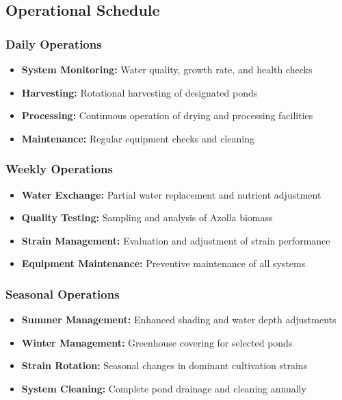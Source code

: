 \subsection{Operational Schedule}

\subsubsection{Daily Operations}
\begin{itemize}
    \item \textbf{System Monitoring:} Water quality, growth rate, and health checks
    \item \textbf{Harvesting:} Rotational harvesting of designated ponds
    \item \textbf{Processing:} Continuous operation of drying and processing facilities
    \item \textbf{Maintenance:} Regular equipment checks and cleaning
\end{itemize}

\subsubsection{Weekly Operations}
\begin{itemize}
    \item \textbf{Water Exchange:} Partial water replacement and nutrient adjustment
    \item \textbf{Quality Testing:} Sampling and analysis of Azolla biomass
    \item \textbf{Strain Management:} Evaluation and adjustment of strain performance
    \item \textbf{Equipment Maintenance:} Preventive maintenance of all systems
\end{itemize}

\subsubsection{Seasonal Operations}
\begin{itemize}
    \item \textbf{Summer Management:} Enhanced shading and water depth adjustments
    \item \textbf{Winter Management:} Greenhouse covering for selected ponds
    \item \textbf{Strain Rotation:} Seasonal changes in dominant cultivation strains
    \item \textbf{System Cleaning:} Complete pond drainage and cleaning annually
\end{itemize}

